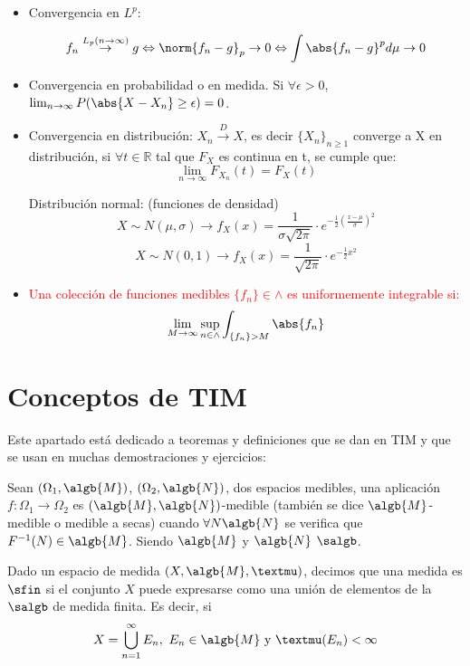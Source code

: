 \documentclass{apuntes}
\begin{document}
\begin{itemize}
\item Convergencia en $L^p$:

\[
f_n \stackrel{L_p (n\rightarrow \infty)}{\rightarrow} g \Leftrightarrow \norm{f_n -g}_p  \rightarrow 0 \Leftrightarrow \int{\abs{f_n -g}^pd\mu} \rightarrow 0
\]

\item Convergencia en probabilidad o en medida. Si $\forall \epsilon >0$, $\lim_{n \rightarrow \infty}P(\abs{X-X_n}\geq \epsilon)=0$.

\item Convergencia en distribución: $X_n \stackrel{D}{\rightarrow} X$, es decir $\{X_n\}_{n \geq 1}$ converge a X en distribución, si $\forall t \in \mathbb{R}$ tal que $F_X$ es continua en t, se cumple que:
\[
\lim_{n \rightarrow \infty} F_{X_n}(t)=F_X(t)
\]

\text Distribución normal: (funciones de densidad)
\[
X\sim N(\mu, \sigma) \rightarrow f_X(x)=\frac{1}{\sigma \sqrt{2\pi}}\cdot e^{-\frac{1}{2}(\frac{x-\mu}{\sigma})^2}
\]
\[
X \sim N(0,1) \rightarrow f_X(x)=\frac{1}{\sqrt{2\pi}}\cdot e^{-\frac{1}{2}x^2}
\]

\item \textcolor{red}{ Una colección de funciones medibles $\{f_n\} \in \wedge$ es uniformemente integrable si:
\[
\lim_{M \rightarrow \infty} \sup_{n \in \wedge} \int_{\{f_n\} > M} \abs{f_n}
\]
}

\end{itemize}

\section{Conceptos de TIM}
Este apartado está dedicado a teoremas y definiciones que se dan en TIM y que se usan en muchas demostraciones y ejercicios:

\begin{defn}
Sean $(\Omega_1, \algb{M})$, $(\Omega_2, \algb{N})$, dos espacios medibles, una aplicación $f:\Omega_1 \rightarrow \Omega_2$ es $(\algb{M}, \algb{N})$-medible (también se dice $\algb{M}$-medible o medible a secas) cuando $\forall N \algb{N}$ se verifica que $F^{-1}(N) \in \algb{M}$. Siendo $\algb{M}$ y $\algb{N}$ $\salgb$.
\end{defn}

\begin{defn}\label{defSigmaFinita}
Dado un espacio de medida $(X, \algb{M}, µ)$, decimos que una medida es $\sfin$ si el conjunto $X$ puede expresarse como una unión de elementos de la $\salgb$ de medida finita. Es decir, si \[X=\bigcup_{n=1}^{\infty}E_n, \ E_n \in \algb{M} \text{ y }µ(E_n)< \infty\]
\end{defn}
\end{document}
